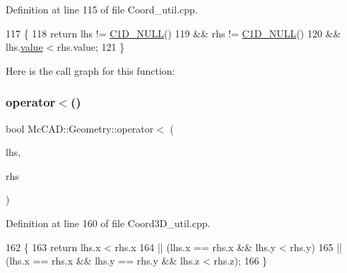 Definition at line 115 of file Coord\+\_\+util.\+cpp.


\begin{DoxyCode}
117                          \{
118     \textcolor{keywordflow}{return} lhs != \hyperlink{namespaceMcCAD_1_1Geometry_ab581ddc27c8a6530d9c1657b77ffe0bf}{C1D\_NULL}()
119             && rhs != \hyperlink{namespaceMcCAD_1_1Geometry_ab581ddc27c8a6530d9c1657b77ffe0bf}{C1D\_NULL}()
120             && lhs.\hyperlink{classMcCAD_1_1Geometry_1_1Coord_a540aea93d3b1a9cfd505e1e0b96b2b91}{value} < rhs.value;
121 \}
\end{DoxyCode}
Here is the call graph for this function\+:
\mbox{\label{namespaceMcCAD_1_1Geometry_af0f1e06a8bb9d86b000cc831eb9cb2d2}} 
\subsubsection{\texorpdfstring{operator$<$()}{operator<()}\hspace{0.1cm}{\footnotesize\ttfamily [3/3]}}
{\footnotesize\ttfamily bool Mc\+C\+A\+D\+::\+Geometry\+::operator$<$ (\begin{DoxyParamCaption}\item[{const \hyperlink{classMcCAD_1_1Geometry_1_1Coord3D}{Coord3D} \&}]{lhs,  }\item[{const \hyperlink{classMcCAD_1_1Geometry_1_1Coord3D}{Coord3D} \&}]{rhs }\end{DoxyParamCaption})}



Definition at line 160 of file Coord3\+D\+\_\+util.\+cpp.


\begin{DoxyCode}
162                            \{
163     \textcolor{keywordflow}{return} lhs.x < rhs.x
164             || (lhs.x == rhs.x && lhs.y < rhs.y)
165             || (lhs.x == rhs.x && lhs.y == rhs.y && lhs.z < rhs.z);
166 \}
\end{DoxyCode}
\mbox{\label{namespaceMcCAD_1_1Geometry_ab6dc1b7186d343fb0cc612c43f5eb171}} 
